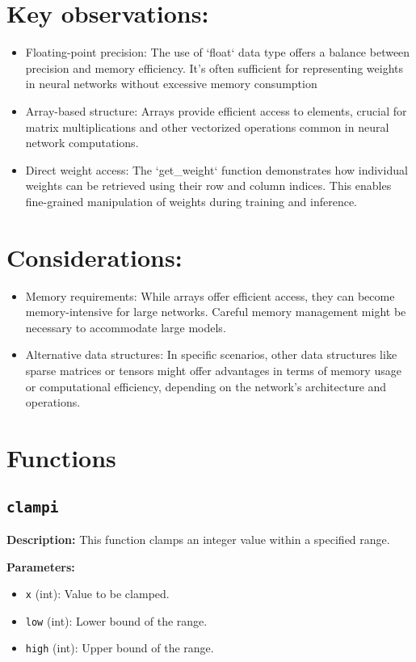\documentclass{article}
\begin{document}
\section*{Key observations:}
\begin{itemize}
  

    \item Floating-point precision: The use of `float` data type offers a balance between precision and memory efficiency. It's often sufficient for representing weights in neural networks without excessive memory consumption
    \item Array-based structure: Arrays provide efficient access to elements, crucial for matrix multiplications and other vectorized operations common in neural network computations.
    \item Direct weight access: The `get\_weight` function demonstrates how individual weights can be retrieved using their row and column indices. This enables fine-grained manipulation of weights during training and inference.
    \end{itemize}

\section*{Considerations:}
\begin{itemize}
    \item  Memory requirements: While arrays offer efficient access, they can become memory-intensive for large networks. Careful memory management might be necessary to accommodate large models.
    \item  Alternative data structures: In specific scenarios, other data structures like sparse matrices or tensors might offer advantages in terms of memory usage or computational efficiency, depending on the network's architecture and operations.
\end{itemize}
\clearpage
\section{Functions}

\subsection*{\texttt{clampi}}

\textbf{Description:} This function clamps an integer value within a specified range.

\textbf{Parameters:}
\begin{itemize}
    \item \texttt{x} (int): Value to be clamped.
    \item \texttt{low} (int): Lower bound of the range.
    \item \texttt{high} (int): Upper bound of the range.
\end{itemize}
\end{document}
